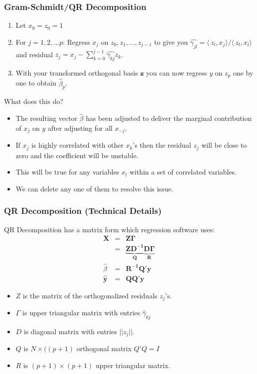 \documentclass[xcolor=pdftex,dvipsnames,table,mathserif,aspectratio=169]{beamer}
\begin{document}
\begin{frame}
\frametitle{Gram-Schmidt/QR Decomposition}
\small
\begin{enumerate}
\item Let $x_0 = z_0 = 1$
\item For $j = 1,2,\ldots p$: Regress $x_j$ on $z_0,z_1,\ldots,z_{j-1}$  to give you $\hat{\gamma_{jl}} = \langle\, z_l, x_j \rangle/\langle\, z_l, x_l \rangle$ and residual $z_j = x_j  - \sum_{k=0}^{j-1} \hat{\gamma_{kj}} z_k$.
\item With your transformed orthogonal basis $\mathbf{z}$ you can now regress $y$ on $z_p$ one by one to obtain $\hat{\beta}_p$.
\end{enumerate}
What does this do?
\begin{itemize}
\item The resulting vector $\hat{\beta}$ has been adjusted to deliver the marginal contribution of $x_j$ on $y$ after adjusting for all $x_{-j}$.
\item If $x_j$ is highly correlated with other $x_k$'s then the residual $z_j$ will be close to zero and the coefficient will be unstable.
\item This will be true for any variables $x_l$ within a set of correlated variables.
\item We can delete any one of them to resolve this issue.
\end{itemize}
\end{frame}


\begin{frame}
\frametitle{QR Decomposition (Technical Details)}
\small
QR Decomposition has a matrix form which regression software uses:
\begin{eqnarray*}
\mathbf{X} &=& \mathbf{Z \Gamma} \\
    &=& \mathbf{\underbrace{Z D^{-1}}_{Q} \underbrace{D \Gamma}_{R}} \\
    \hat{\beta} &=& \mathbf{R^{-1} Q' y}\\
    \hat{\mathbf{y}} &=& \mathbf{Q Q'} \mathbf{y}
\end{eqnarray*}
\vspace{-0.5cm}
\begin{itemize}
\item $Z$ is the matrix of the orthogonalized residuals $z_j$'s.
\item $\Gamma$ is upper triangular matrix with entries $\hat{\gamma}_{kj}$
\item $D$ is diagonal matrix with entries $|| z_j ||$.
\item $Q$ is $N \times ((p+1)$ orthogonal  matrix $Q'Q = I$ 
\item $R$ is $(p+1) \times (p+1)$ upper triangular matrix.
\end{itemize}
\end{frame}
\end{document}
